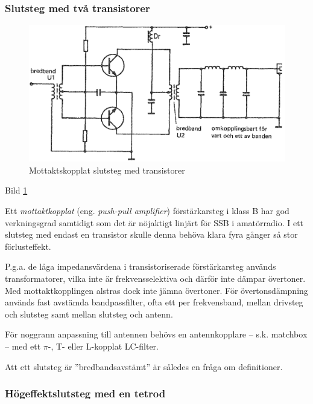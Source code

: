 \subsubsection{Slutsteg med två transistorer}

\begin{figure}
\includegraphics[width=\textwidth]{images/cropped_pdfs/bild_2_3-49.pdf}
\caption{Mottaktskopplat slutsteg med transistorer}
\label{fig:BildII3-49}
\end{figure}

Bild \ref{fig:BildII3-49}

Ett \emph{mottaktkopplat} (eng. \emph{push-pull amplifier}) förstärkarsteg i
klass B har god verkningsgrad samtidigt som det är nöjaktigt linjärt för SSB i
amatörradio. I ett slutsteg med endast en transistor skulle denna
behöva klara fyra gånger så stor förlusteffekt.

P.g.a. de låga impedansvärdena i transistoriserade förstärkarsteg
används transformatorer, vilka inte är frekvensselektiva och därför
inte dämpar övertoner. Med mottaktkopplingen alstras dock inte jämna
övertoner. För övertonsdämpning används fast avstämda bandpassfilter,
ofta ett per frekvensband, mellan drivsteg och slutsteg samt mellan
slutsteg och antenn.

För noggrann anpassning till antennen behövs en antennkopplare --
s.k. matchbox -- med ett \(\pi \)-, T- eller L-kopplat LC-filter.

Att ett slutsteg är ''bredbandsavstämt'' är således en fråga om
definitioner.

\subsubsection{Högeffektslutsteg med en tetrod}

